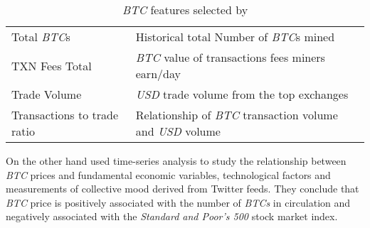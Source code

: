 \begin{table}[htb]
\begin{tabularx}{\textwidth}{XX}
    Total \textit{BTC}s & Historical total Number of \textit{BTC}s mined \\
    TXN Fees Total & \textit{BTC} value of transactions fees miners earn/day \\
    Trade Volume & \textit{USD} trade volume from the top exchanges \\
    Transactions to trade ratio & Relationship of \textit{BTC} transaction
                                  volume and \textit{USD} volume \\
    \bottomrule
  \end{tabularx}
  \caption{\textit{BTC} features selected by
    \cite{madan_automated_2014}}
  \label{tab:bitcoin-features-madan}
\end{table}

On the other hand \cite{georgoula_using_2015} used time-series
analysis to study the relationship between \textit{BTC} prices and
fundamental economic variables, technological factors and measurements
of collective mood derived from Twitter feeds. They conclude that
\textit{BTC} price is positively associated with the number of
\textit{BTCs} in circulation and negatively associated with the
\textit{Standard and Poor's 500} stock market index.


